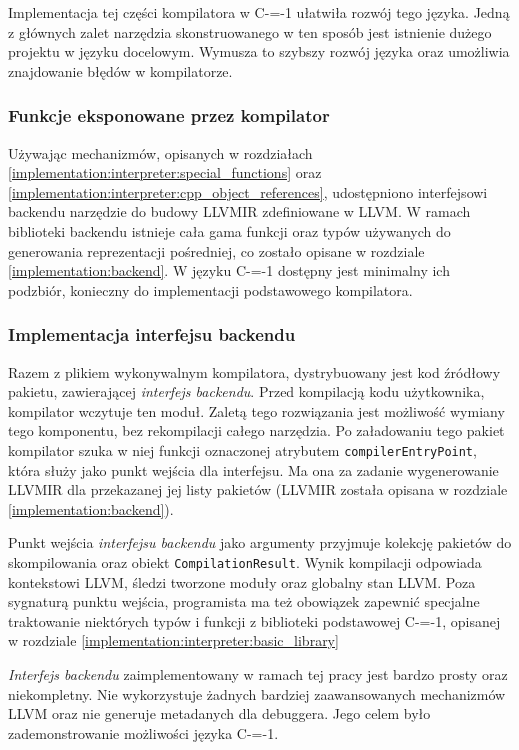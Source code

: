 Implementacja tej części kompilatora w C-=-1 ułatwiła rozwój tego języka.
Jedną z głównych zalet narzędzia skonstruowanego w ten sposób jest istnienie dużego projektu w języku docelowym.
Wymusza to szybszy rozwój języka oraz umożliwia znajdowanie błędów w kompilatorze.

\subsubsection{Funkcje eksponowane przez kompilator}

Używając mechanizmów, opisanych w rozdziałach \ref{implementation:interpreter:special_functions} oraz \ref{implementation:interpreter:cpp_object_references}, udostępniono interfejsowi backendu narzędzie do budowy LLVMIR zdefiniowane w LLVM.
W ramach biblioteki backendu istnieje cała gama funkcji oraz typów używanych do generowania reprezentacji pośredniej, co zostało opisane w rozdziale \ref{implementation:backend}.
W języku C-=-1 dostępny jest minimalny ich podzbiór, konieczny do implementacji podstawowego kompilatora.

\subsubsection{Implementacja interfejsu backendu}

Razem z plikiem wykonywalnym kompilatora, dystrybuowany jest kod źródłowy pakietu, zawierającej \emph{interfejs backendu}. 
Przed kompilacją kodu użytkownika, kompilator wczytuje ten moduł.
Zaletą tego rozwiązania jest możliwość wymiany tego komponentu, bez rekompilacji całego narzędzia.
Po załadowaniu tego pakiet kompilator szuka w niej funkcji oznaczonej atrybutem \lstinline{compilerEntryPoint}, która służy jako punkt wejścia dla interfejsu. 
Ma ona za zadanie wygenerowanie LLVMIR dla przekazanej jej listy pakietów (LLVMIR została opisana w rozdziale \ref{implementation:backend}).

Punkt wejścia \emph{interfejsu backendu} jako argumenty przyjmuje kolekcję pakietów do skompilowania oraz obiekt \lstinline{CompilationResult}.
Wynik kompilacji odpowiada kontekstowi LLVM, śledzi tworzone moduły oraz globalny stan LLVM.
Poza sygnaturą punktu wejścia, programista ma też obowiązek zapewnić specjalne traktowanie niektórych typów i funkcji z biblioteki podstawowej C-=-1, opisanej w rozdziale \ref{implementation:interpreter:basic_library}

\emph{Interfejs backendu} zaimplementowany w ramach tej pracy jest bardzo prosty oraz niekompletny.
Nie wykorzystuje żadnych bardziej zaawansowanych mechanizmów LLVM oraz nie generuje metadanych dla debuggera.
Jego celem było zademonstrowanie możliwości języka C-=-1.

